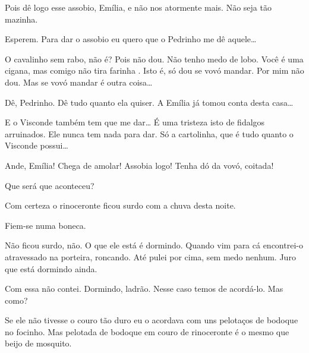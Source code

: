  Pois dê logo esse assobio, Emília, e não nos atormente
mais. Não seja tão mazinha.

 Esperem. Para dar o assobio eu quero que o Pedrinho me dê
aquele\ldots{}

 O cavalinho sem rabo, não é? Pois não dou. Não tenho medo
de lobo. Você é uma cigana, mas comigo não tira farinha . Isto é, só dou se vovó mandar.
Por mim não dou. Mas se vovó mandar é outra coisa\ldots{}

  Dê, Pedrinho. Dê tudo quanto ela
quiser. A Emília já tomou conta desta casa\ldots{}

  E o Visconde também tem que me dar\ldots{}
É uma tristeza isto de fidalgos arruinados. Ele nunca tem nada para dar.
Só a cartolinha, que é tudo quanto o Visconde possui\ldots{}

 Ande, Emília! Chega de amolar! Assobia logo! Tenha dó da vovó, coitada!


 Que será que aconteceu?

 Com certeza o rinoceronte ficou surdo com a chuva desta
noite.

  Fiem-se numa boneca.

 Não ficou surdo, não. O que ele está é dormindo. Quando vim
para cá encontrei-o atravessado na porteira, roncando. Até pulei por
cima, sem medo nenhum. Juro que está dormindo ainda.

  Com essa não contei. Dormindo, ladrão.
Nesse caso temos de acordá-lo. Mas como?

 Se ele não tivesse o couro tão duro eu o acordava com uns
pelotaços de bodoque no focinho. Mas pelotada de bodoque em couro de
rinoceronte é o mesmo que beijo de mosquito.



